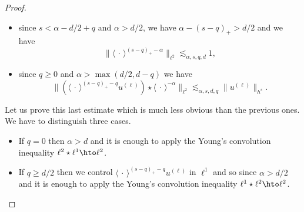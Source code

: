\begin{proof}
\begin{itemize}
\item
since $s<\alpha -d/2+q$ and $\alpha > d/2$, we have $\alpha-(s-q)_+> d/2$ and we have
\[
\| \langle \, \cdot \, \rangle^{(s-q)_+-\alpha} \|_{\ell^2} \lesssim_{\alpha,s,q,d} 1,
\]

\item
since $q \geq 0$ and $\alpha> \max(d/2,d-q)$ we have
\[
\| (\langle \, \cdot\,\rangle^{(s-q)_+-q} u^{(\ell)}) \star \langle \, \cdot \, \rangle^{-\alpha} \|_{\ell^2} \lesssim_{\alpha,s,d,q}\| u^{(\ell)} \|_{h^s}.
\]
\end{itemize}
Let us prove this last estimate which is much less obvious than the previous ones. We have to distinguish three cases.
\begin{itemize}
\item
If $q=0$ then $\alpha>d$ and it is enough to apply the Young's convolution inequality $\ell^2 \star \ell^1 \hto \ell^2$.

\item
If $q\geq d/2$ then we control $\langle \, \cdot\,\rangle^{(s-q)_+-q} u^{(\ell)}$ in $\ell^1$ and so since $\alpha>d/2$ and it is enough to apply the Young's convolution inequality $\ell^1 \star \ell^2 \hto \ell^2$.


\end{itemize}
\end{proof}
